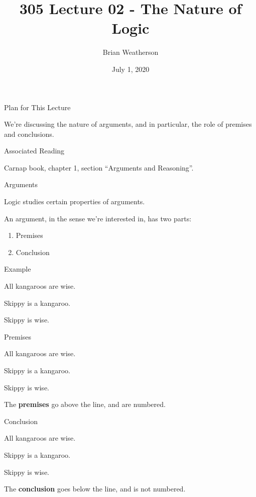 \documentclass[
  ignorenonframetext,
]{beamer}
\title{305 Lecture 02 - The Nature of Logic}
\author{Brian Weatherson}
\date{July 1, 2020}
\providecommand{\tightlist}{%
  \setlength{\itemsep}{0pt}\setlength{\parskip}{0pt}}
\renewcommand{\,}{\text{, }}
\renewenvironment*{quote}	
	{\list{}{\rightmargin   \leftmargin} \item } 	
	{\endlist }
\newcommand{\DisplayArg}[2]{
\begin{enumerate}
{#1}
\end{enumerate}
\vspace{-6pt}
\hrulefill

\begin{quote}
{\normalfont #2}
\end{quote}
\vspace{12pt}
}
\begin{document}
\frame{\titlepage}

\begin{frame}{Plan for This Lecture}
\protect\hypertarget{plan-for-this-lecture}{}

We're discussing the nature of arguments, and in particular, the role of
premises and conclusions.

\end{frame}

\begin{frame}{Associated Reading}
\protect\hypertarget{associated-reading}{}

Carnap book, chapter 1, section ``Arguments and Reasoning''.

\end{frame}

\begin{frame}{Arguments}
\protect\hypertarget{arguments}{}

Logic studies certain properties of arguments.

An argument, in the sense we're interested in, has two parts:

\begin{enumerate}
\tightlist
\item
  Premises
\item
  Conclusion
\end{enumerate}

\end{frame}

\begin{frame}{Example}
\protect\hypertarget{example}{}

\DisplayArg{ \item All kangaroos are wise. \item Skippy is a kangaroo. } { Skippy is wise. }

\end{frame}

\begin{frame}{Premises}
\protect\hypertarget{premises}{}

\DisplayArg{ \item All kangaroos are wise. \item Skippy is a kangaroo. } { Skippy is wise. }

The \textbf{premises} go above the line, and are numbered.

\end{frame}

\begin{frame}{Conclusion}
\protect\hypertarget{conclusion}{}

\DisplayArg{ \item All kangaroos are wise. \item Skippy is a kangaroo. } { Skippy is wise. }

The \textbf{conclusion} goes below the line, and is not numbered.

\end{frame}
\end{document}
